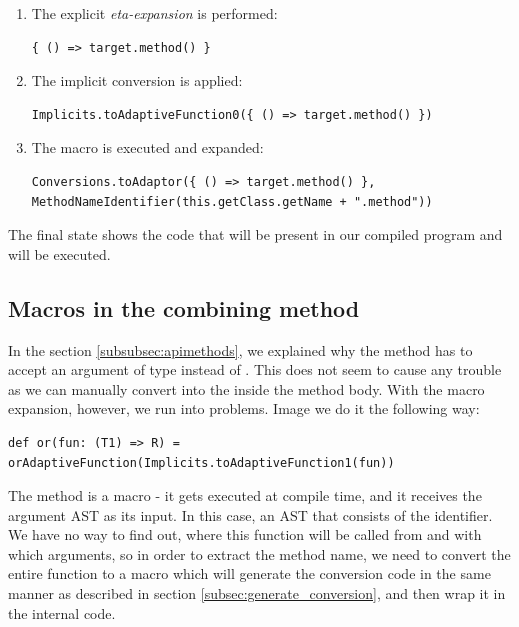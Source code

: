 \begin{enumerate}
	\item The explicit \textit{eta-expansion} is performed:
	\lstset{style=Scala}
	\begin{lstlisting}
{ () => target.method() }
	\end{lstlisting}
	\item The implicit conversion is applied:
		\lstset{style=Scala}
	\begin{lstlisting}
Implicits.toAdaptiveFunction0({ () => target.method() })
		\end{lstlisting}
		\item The macro  is executed and expanded:
		\lstset{style=Scala}
		\begin{lstlisting}
Conversions.toAdaptor({ () => target.method() }, MethodNameIdentifier(this.getClass.getName + ".method"))
		\end{lstlisting}
\end{enumerate}

The final state shows the code that will be present in our compiled program and will be executed.

\subsection{Macros in the combining method}

In the section \ref{subsubsec:apimethods}, we explained why the  method has to accept an argument of  type instead of . This does not seem to cause any trouble as we can manually convert  into the  inside the method body. With the macro expansion, however, we run into problems. Image we do it the following way:
\lstset{style=Scala}
\begin{lstlisting}
def or(fun: (T1) => R) = orAdaptiveFunction(Implicits.toAdaptiveFunction1(fun))
\end{lstlisting}

The   method is a macro - it gets executed at compile time, and it receives the argument AST as its input. In this case, an AST that consists of the  identifier. We have no way to find out, where this function will be called from and with which arguments, so in order to extract the method name, we need to convert the entire  function to a macro which will generate the conversion code in the same manner as described in section \ref{subsec:generate_conversion}, and then wrap it in the internal  code.

